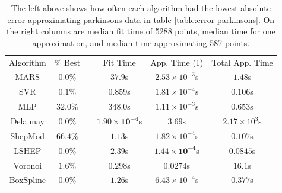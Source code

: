 \documentclass[smallextended,final]{svjour3}       %
\begin{document}
\begin{appendix}
\begin{table}
  \centering
  \begin{tabular}{|c|c| c |c|c|c|}
    \cline{1-2}\cline{4-6}
    Algorithm & \% Best &  & Fit Time & App. Time (1) & Total App. Time\\
    \cline{1-2}\cline{4-6}
    MARS & $0.0\%$ &  & $37.9$s & $2.53 \times 10^{-3}$s & $1.48$s\\
    SVR & $0.1\%$ &  & $0.859$s & $\mathit{1.81 \times 10^{-4}}$s & $\mathit{0.106}$s\\
    MLP & $\mathit{32.0}\%$ &  & $348.0$s & $1.11 \times 10^{-3}$s & $0.653$s\\
    Delaunay & $0.0\%$ &  & $\mathbf{1.90 \times 10^{-4}}$s & $3.69$s & $2.17 \times 10^{3}$s\\
    ShepMod & $\mathbf{66.4}\%$ &  & $1.13$s & $1.82 \times 10^{-4}$s & $0.107$s\\
    LSHEP & $0.0\%$ &  & $2.39$s & $\mathbf{1.44 \times 10^{-4}}$s & $\mathbf{0.0845}$s\\
    Voronoi & $1.6\%$ &  & $\mathit{0.298}$s & $0.0274$s & $16.1$s\\
    BoxSpline & $0.0\%$ &  & $1.26$s & $6.43 \times 10^{-4}$s & $0.377$s\\
    \cline{1-2}\cline{4-6}
  \end{tabular}
  \caption{The left above shows how often each algorithm had the
    lowest absolute error approximating parkinsons data in table
    \ref{table:error-parkinsons}. On the right columns are median fit
    time of 5288 points, median time for one approximation, and median
    time approximating 587 points.}
  \label{table:best-parkinsons}
\end{table}



\end{appendix}
\end{document}
